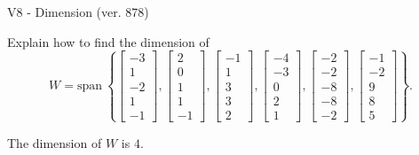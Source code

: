 \begin{exercise}
  \begin{exerciseTitle}V8 - Dimension (ver. 878)\end{exerciseTitle}
  \begin{exerciseStatement}
    Explain how to find the dimension of 
\[W=\mathrm{span}\ \left\{\left[\begin{array}{r}
-3 \\
1 \\
-2 \\
1 \\
-1
\end{array}\right] , \left[\begin{array}{r}
2 \\
0 \\
1 \\
1 \\
-1
\end{array}\right] , \left[\begin{array}{r}
-1 \\
1 \\
3 \\
3 \\
2
\end{array}\right] , \left[\begin{array}{r}
-4 \\
-3 \\
0 \\
2 \\
1
\end{array}\right] , \left[\begin{array}{r}
-2 \\
-2 \\
-8 \\
-8 \\
-2
\end{array}\right] , \left[\begin{array}{r}
-1 \\
-2 \\
9 \\
8 \\
5
\end{array}\right]\right\}.\]



  \end{exerciseStatement}
  \begin{exerciseAnswer}
   The dimension of \(W\) is  \(4\).
  


  \end{exerciseAnswer}
\end{exercise}